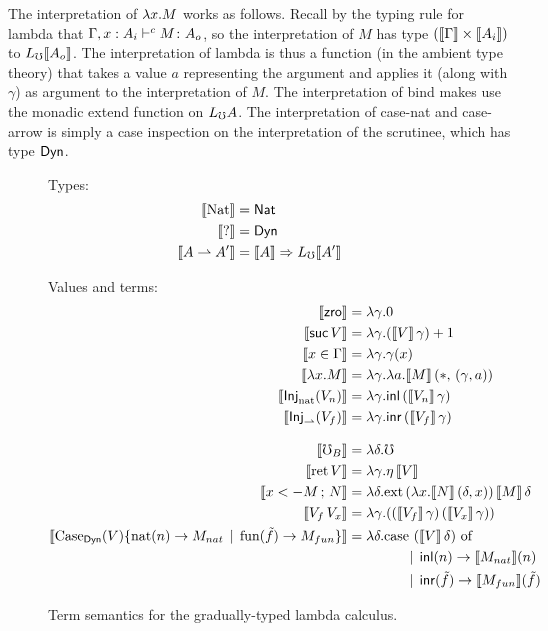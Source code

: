 The interpretation of $\lambda {x} . {M}$ works as follows. Recall by the typing rule for
lambda that ${\Gamma, x : A_i} \vdash^c {M} \colon {{A_o}}$, so the interpretation of $M$
has type $(\llbracket {\Gamma} \rrbracket \times \llbracket {A_i} \rrbracket)$ to $L_\mho \llbracket {A_o} \rrbracket$.
The interpretation of lambda is thus a function (in the ambient type theory) that takes
a value $a$ representing the argument and applies it (along with $\gamma$) as argument to
the interpretation of $M$.
%
The interpretation of bind makes use the monadic extend function on $L_\mho A$.
%
The interpretation of case-nat and case-arrow is simply a case inspection on the
interpretation of the scrutinee, which has type $\mathsf{Dyn}$.


\vspace{2ex}


\begin{figure*}
  \noindent Types:
  \begin{align*}
    \llbracket {\text{Nat}} \rrbracket &= \mathsf{Nat} \\
    \llbracket {?} \rrbracket &= \mathsf{Dyn} \\
    \llbracket {A \rightharpoonup A'} \rrbracket &= \llbracket {A} \rrbracket \Rightarrow L_\mho \llbracket {A'} \rrbracket \\
  \end{align*}


  \noindent Values and terms:
  \begin{align*}
    \llbracket {\textsf{zro}} \rrbracket         &= \lambda \gamma . 0 \\
    \llbracket {\textsf{suc}\, V} \rrbracket     &= \lambda \gamma . (\llbracket {V} \rrbracket\, \gamma) + 1 \\
    \llbracket {x \in \Gamma} \rrbracket &= \lambda \gamma . \gamma(x) \\
    \llbracket {\lambda {x} . {M}} \rrbracket   &= \lambda \gamma . \lambda a . \llbracket {M} \rrbracket\, (*,\, (\gamma , a))  \\
    \llbracket {\textsf{Inj}_\text{nat} ({V_n})} \rrbracket &= \lambda \gamma . \mathsf{inl}\, (\llbracket {V_n} \rrbracket\, \gamma) \\
    \llbracket {\textsf{Inj}_\rightharpoonup({V_f})} \rrbracket &= \lambda \gamma . \mathsf{inr}\, (\llbracket {V_f} \rrbracket\, \gamma) \\[2ex]
    \llbracket {\mho_B} \rrbracket         &= \lambda \delta . \mho \\
    \llbracket {\text{ret}\, V} \rrbracket       &= \lambda \gamma . \eta\, \llbracket {V} \rrbracket \\
    \llbracket {{x} <- {M}\, ; \, {N}} \rrbracket &= \lambda \delta . \text{ext}\,{(\lambda x . \llbracket {N} \rrbracket\, (\delta, x))}\,{\llbracket {M} \rrbracket\, \delta} \\
    \llbracket {V_f\, V_x} \rrbracket      &= \lambda \gamma . {({(\llbracket {V_f} \rrbracket\, \gamma)} \, {(\llbracket {V_x} \rrbracket\, \gamma)})} \\
    \llbracket {\text{Case}_{\mathsf{Dyn}}({V}) \{ \text{nat}({n}) \to {M_{nat}} \mathrel{\bf \,\mid\,}\text{fun}({\tilde{f}}) \to {M_{fun}} \}} \rrbracket &=
      \lambda \delta . \text{case $(\llbracket {V} \rrbracket\, \delta)$ of} \\ 
      &\quad\quad\quad\quad \mathrel{\bf \,\mid\,} \mathsf{inl}(n) \to \llbracket {M_{nat}} \rrbracket(n) \\
      &\quad\quad\quad\quad \mathrel{\bf \,\mid\,} \mathsf{inr}(\tilde{f}) \to \llbracket {M_{fun}} \rrbracket(\tilde{f})
  \end{align*}

  \caption{Term semantics for the gradually-typed lambda calculus.}
  \label{fig:term-semantics}
\end{figure*}
